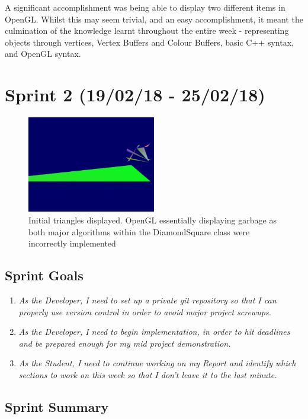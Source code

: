 \documentclass[a4paper,10pt]{report}
\begin{document}
A significant accomplishment was being able to display two different items in OpenGL. Whilst this may seem trivial, and an easy accomplishment, it meant the culmination of the knowledge learnt throughout the entire week - representing objects through vertices, Vertex Buffers and Colour Buffers, basic C++ syntax, and OpenGL syntax.\medskip

\clearpage
\section{Sprint 2 (19/02/18 - 25/02/18)}

\begin{figure}[h!]
    \centering
  \includegraphics[width=0.5\textwidth]{Sprint2-1.png}
 \caption{Initial triangles displayed. OpenGL essentially displaying garbage as both major algorithms within the DiamondSquare class were incorrectly implemented}
 \label{fig:sprint2-1}
\end{figure}

\subsection{Sprint Goals}
\begin{enumerate}
    \item \textit{As the Developer, I need to set up a private git repository so that I can properly use version control in order to avoid major project screwups.
    }
    \item \textit{As the Developer, I need to begin implementation, in order to hit deadlines and be prepared enough for my mid project demonstration.}
    \item\textit{As the Student, I need to continue working on my Report and identify which sections to work on this week so that I don't leave it to the last minute.}
    
\end{enumerate}

\subsection{Sprint Summary}
\end{document}
